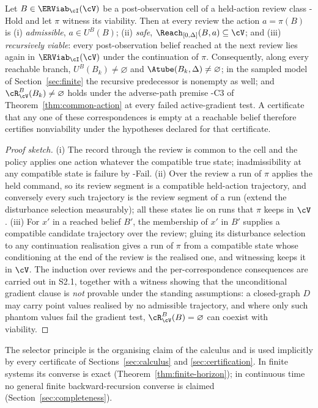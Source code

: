 \begin{proposition}\label{prop:selector}
Let $B\in\ERViab_\cI(\cV)$ be a post-observation cell of a held-action review class \hyp{Hold} and let $\pi$ witness its viability. Then at every review the action $a=\pi(B)$ is (i) \emph{admissible}, $a\in U^B(B)$; (ii) \emph{safe}, $\Reach_{[0,\Delta]}(B,a)\subseteq\cV$; and (iii) \emph{recursively viable}: every post-observation belief reached at the next review lies again in $\ERViab_\cI(\cV)$ under the continuation of $\pi$. Consequently, along every reachable branch, $U^B(B_k)\ne\varnothing$ and $\Atube(B_k,\Delta)\ne\varnothing$; in the sampled model of Section~\ref{sec:finite} the recursive predecessor is nonempty as well; and $\cR^B_\cV(B_k)\ne\varnothing$ holds under the adverse-path premise \hyp{C3} of Theorem~\ref{thm:common-action} at every failed active-gradient test. A certificate that any one of these correspondences is empty at a reachable belief therefore certifies nonviability under the hypotheses declared for that certificate.
\end{proposition}

\begin{proof}[Proof sketch]
(i) The record through the review is common to the cell and the policy applies one action whatever the compatible true state; inadmissibility at any compatible state is failure by \hyp{Fail}. (ii) Over the review a run of $\pi$ applies the held command, so its review segment is a compatible held-action trajectory, and conversely every such trajectory is the review segment of a run (extend the disturbance selection measurably); all these states lie on runs that $\pi$ keeps in $\cV$. (iii) For $x'$ in a reached belief $B'$, the membership of $x'$ in $B'$ supplies a compatible candidate trajectory over the review; gluing its disturbance selection to any continuation realisation gives a run of $\pi$ from a compatible state whose conditioning at the end of the review is the realised one, and witnessing keeps it in $\cV$. The induction over reviews and the per-correspondence consequences are carried out in S2.1, together with a witness showing that the unconditional gradient clause is \emph{not} provable under the standing assumptions: a closed-graph $D$ may carry point values realised by no admissible trajectory, and where only such phantom values fail the gradient test, $\cR^B_\cV(B)=\varnothing$ can coexist with viability.
\end{proof}

The selector principle is the organising claim of the calculus and is used implicitly by every certificate of Sections~\ref{sec:calculus} and \ref{sec:certification}. In finite systems its converse is exact (Theorem~\ref{thm:finite-horizon}); in continuous time no general finite backward-recursion converse is claimed (Section~\ref{sec:completeness}).

